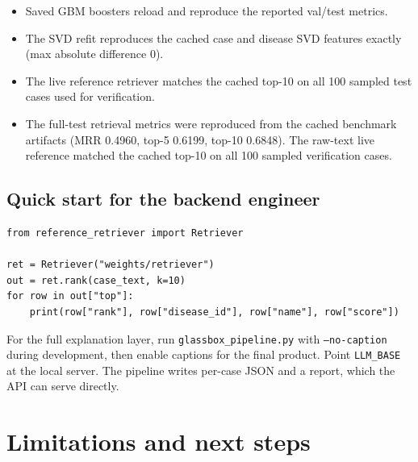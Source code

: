 \documentclass[11pt,a4paper]{article}
\newcommand{\code}[1]{\texttt{\small #1}}
\begin{document}
\begin{itemize}[leftmargin=1.4em]
\item Saved GBM boosters reload and reproduce the reported val/test metrics.
\item The SVD refit reproduces the cached case and disease SVD features exactly
(max absolute difference 0).
\item The live reference retriever matches the cached top-10 on all 100 sampled
test cases used for verification.
\item The full-test retrieval metrics were reproduced from the cached benchmark
artifacts (MRR 0.4960, top-5 0.6199, top-10 0.6848). The raw-text live reference
matched the cached top-10 on all 100 sampled verification cases.
\end{itemize}

\subsection{Quick start for the backend engineer}

\begin{lstlisting}
from reference_retriever import Retriever

ret = Retriever("weights/retriever")
out = ret.rank(case_text, k=10)
for row in out["top"]:
    print(row["rank"], row["disease_id"], row["name"], row["score"])
\end{lstlisting}

For the full explanation layer, run \code{glassbox\_pipeline.py} with
\code{--no-caption} during development, then enable captions for the final product.
Point \code{LLM\_BASE} at the local server. The pipeline writes per-case JSON and a
report, which the API can serve directly.

\section{Limitations and next steps}
\end{document}
